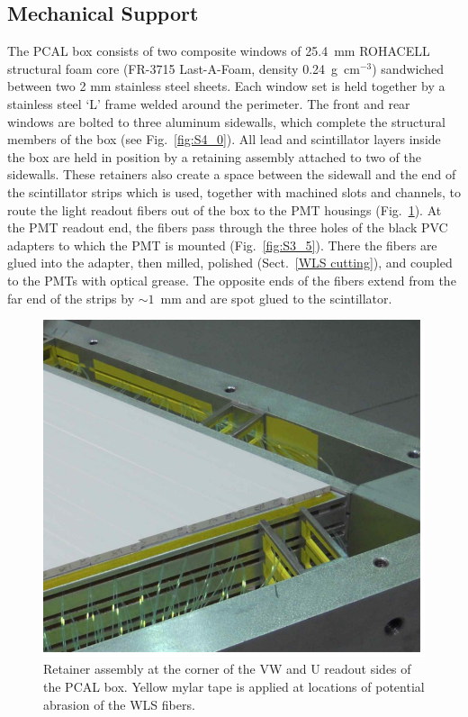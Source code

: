 \subsection{Mechanical Support}

The PCAL box consists of two composite windows of 25.4~mm ROHACELL structural foam core (FR-3715
Last-A-Foam, density 0.24~g~cm$^{-3}$) sandwiched between two 2 mm stainless steel sheets. Each window
set is held together by a stainless steel `L' frame welded around the perimeter. The front and rear windows
are bolted to three aluminum sidewalls, which complete the structural members of the box (see
Fig.~\ref{fig:S4_0}). All lead and scintillator layers inside the box are held in position by a retaining assembly
attached to two of the sidewalls. These retainers also create a space between the sidewall and the end of the
scintillator strips which is used, together with machined slots and channels, to route the light readout fibers out of
the box to the PMT housings (Fig.~\ref{fig:S3_6}).  At the PMT readout end, the fibers pass through the
three holes of the black PVC adapters to which the PMT is mounted (Fig.~\ref{fig:S3_5}).  There the fibers are glued into the adapter,
then milled, polished (Sect.~\ref{WLS cutting}), and coupled to the PMTs with optical grease. The opposite ends
of the fibers extend from the far end of the strips by $\sim 1$~mm and are spot glued to the scintillator.   

\begin{figure}[hbt]
\centering
\includegraphics[width=0.95\columnwidth,keepaspectratio]{img/S3_6.png}
\caption[PCAL UVW Layers]{Retainer assembly at the corner of the VW and U readout sides of the PCAL box.
  Yellow mylar tape is applied at locations of potential abrasion of the WLS fibers.}
\label{fig:S3_6}
\end{figure}

